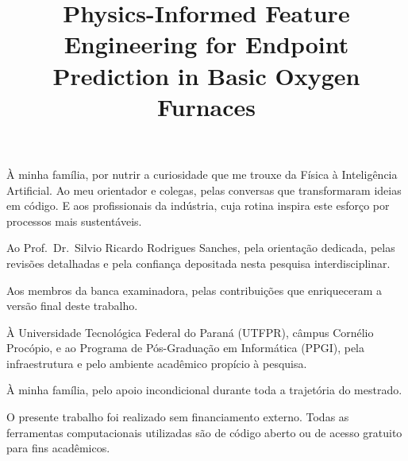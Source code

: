 \documentclass[openright]{normas-utf-tex} %
\title{Physics-Informed Feature Engineering for Endpoint Prediction in Basic Oxygen Furnaces} %
\begin{document}
\capa


\folhaderosto








\begin{dedicatoria}
À minha família, por nutrir a curiosidade que me trouxe da Física à Inteligência Artificial. Ao meu orientador e colegas, pelas conversas que transformaram ideias em código. E aos profissionais da indústria, cuja rotina inspira este esforço por processos mais sustentáveis.
\end{dedicatoria}

\begin{agradecimentos}
Ao Prof.\ Dr.\ Silvio Ricardo Rodrigues Sanches, pela orientação dedicada, pelas revisões detalhadas e pela confiança depositada nesta pesquisa interdisciplinar.

Aos membros da banca examinadora, pelas contribuições que enriqueceram a versão final deste trabalho.

À Universidade Tecnológica Federal do Paraná (UTFPR), câmpus Cornélio Procópio, e ao Programa de Pós-Graduação em Informática (PPGI), pela infraestrutura e pelo ambiente acadêmico propício à pesquisa.

À minha família, pelo apoio incondicional durante toda a trajetória do mestrado.

O presente trabalho foi realizado sem financiamento externo. Todas as ferramentas computacionais utilizadas são de código aberto ou de acesso gratuito para fins acadêmicos.
\end{agradecimentos}

\end{document}
